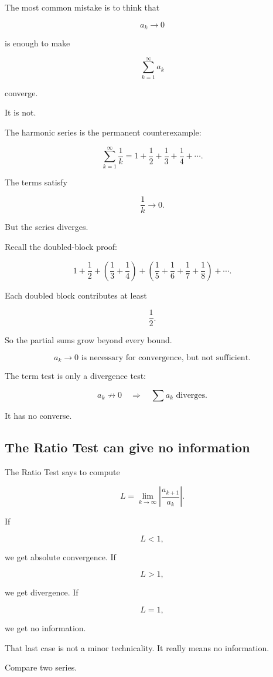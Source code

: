 The most common mistake is to think that

\[
a_k\to0
\]

is enough to make

\[
\sum_{k=1}^{\infty}a_k
\]

converge.

It is not.

The harmonic series is the permanent counterexample:

\[
\sum_{k=1}^{\infty}\frac1k
=
1+\frac12+\frac13+\frac14+\cdots.
\]

The terms satisfy

\[
\frac1k\to0.
\]

But the series diverges.

Recall the doubled-block proof:

\[
1
+\frac12
+\left(\frac13+\frac14\right)
+\left(\frac15+\frac16+\frac17+\frac18\right)
+\cdots.
\]

Each doubled block contributes at least

\[
\frac12.
\]

So the partial sums grow beyond every bound.

\[
\boxed{
a_k\to0 \text{ is necessary for convergence, but not sufficient.}
}
\]

The term test is only a divergence test:

\[
\boxed{
a_k\not\to0
\quad\Longrightarrow\quad
\sum a_k \text{ diverges.}
}
\]

It has no converse.

\subsection{The Ratio Test can give no information}
\label{subsec:warning-ratio-test-no-information}

The Ratio Test says to compute

\[
L=
\lim_{k\to\infty}\left|\frac{a_{k+1}}{a_k}\right|.
\]

If

\[
L<1,
\]

we get absolute convergence.  If

\[
L>1,
\]

we get divergence.  If

\[
L=1,
\]

we get no information.

That last case is not a minor technicality.  It really means no information.

Compare two series.

